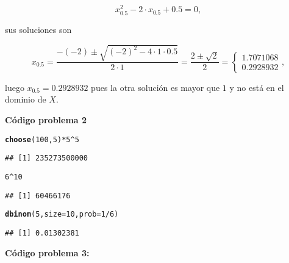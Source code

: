 \documentclass[12pt]{article}\usepackage[]{graphicx}\usepackage[]{color}
\makeatletter
\newcommand{\hlnum}[1]{\textcolor[rgb]{0.686,0.059,0.569}{#1}}%
\newcommand{\hlopt}[1]{\textcolor[rgb]{0,0,0}{#1}}%
\newcommand{\hlstd}[1]{\textcolor[rgb]{0.345,0.345,0.345}{#1}}%
\newcommand{\hlkwc}[1]{\textcolor[rgb]{0.333,0.667,0.333}{#1}}%
\newcommand{\hlkwd}[1]{\textcolor[rgb]{0.737,0.353,0.396}{\textbf{#1}}}%
\newenvironment{kframe}{%
 \def\at@end@of@kframe{}%
 \ifinner\ifhmode%
  \def\at@end@of@kframe{\end{minipage}}%
  \begin{minipage}{\columnwidth}%
 \fi\fi%
 \def\FrameCommand##1{\hskip\@totalleftmargin \hskip-\fboxsep
 \colorbox{shadecolor}{##1}\hskip-\fboxsep
     \hskip-\linewidth \hskip-\@totalleftmargin \hskip\columnwidth}%
 \MakeFramed {\advance\hsize-\width
   \@totalleftmargin\z@ \linewidth\hsize
   \@setminipage}}%
 {\par\unskip\endMakeFramed%
 \at@end@of@kframe}
\newenvironment{knitrout}{}{} %
\makeatother
\begin{document}
$$x_{0.5}^2-2\cdot x_{0.5}+0.5=0,$$

sus soluciones son 

$$
x_{0.5}=\frac{-(-2) \pm\sqrt{(-2)^2 -4\cdot 1\cdot 0.5}}{2\cdot 1}=
\frac{2 \pm\sqrt{2}}{2}=
\left\{\begin{array}{l}
1.7071068\\
0.2928932
\end{array} \right.,
$$


luego $x_{0.5}=0.2928932$ pues la otra solución es mayor que $1$ y  no está en el dominio de $X$.





\newpage

\textbf{Código problema 2}



\begin{knitrout}\scriptsize
{}\color{fgcolor}\begin{kframe}
\begin{alltt}
\hlkwd{choose}\hlstd{(}\hlnum{100}\hlstd{,}\hlnum{5}\hlstd{)}\hlopt{*}\hlnum{5}\hlopt{^}\hlnum{5}
\end{alltt}
\begin{verbatim}
## [1] 235273500000
\end{verbatim}
\begin{alltt}
\hlnum{6}\hlopt{^}\hlnum{10}
\end{alltt}
\begin{verbatim}
## [1] 60466176
\end{verbatim}
\begin{alltt}
\hlkwd{dbinom}\hlstd{(}\hlnum{5}\hlstd{,}\hlkwc{size}\hlstd{=}\hlnum{10}\hlstd{,}\hlkwc{prob}\hlstd{=}\hlnum{1}\hlopt{/}\hlnum{6}\hlstd{)}
\end{alltt}
\begin{verbatim}
## [1] 0.01302381
\end{verbatim}
\end{kframe}
\end{knitrout}


\textbf{Código problema 3:}
\end{document}
